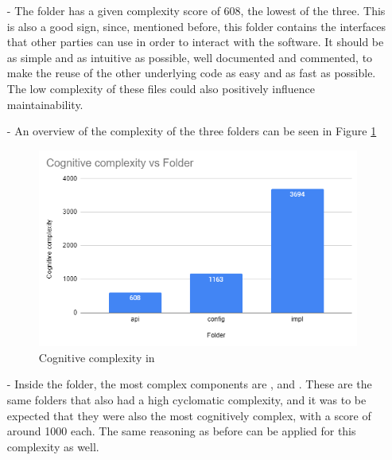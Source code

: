 \begin{itemize}
\begin{itemize}
                    \item[-] The  folder has a given complexity score of 608, the lowest of the three. This is also a good sign, since, mentioned before, this folder contains the interfaces that other parties can use in order to interact with the software. It should be as simple and as intuitive as possible, well documented and commented, to make the reuse of the other underlying code as easy and as fast as possible. The low complexity of these files could also positively influence maintainability. 
                    
                    \item[-] An overview of the complexity of the three folders can be seen in Figure \ref{fig:cognitivecomplexitycore}
                    \begin{figure}[H]
                        \centering
                        \includegraphics[scale=0.8]{figures/step3/cognitivcomplexitycore.PNG}
                        \caption{Cognitive complexity in }
                        \label{fig:cognitivecomplexitycore}
                    \end{figure}
                    
                    \item[-] Inside the  folder, the most complex components are ,  and . These are the same folders that also had a high cyclomatic complexity, and it was to be expected that they were also the most cognitively complex, with a score of around 1000 each. The same reasoning as before can be applied for this complexity as well.
                    

\end{itemize}
\end{itemize}
